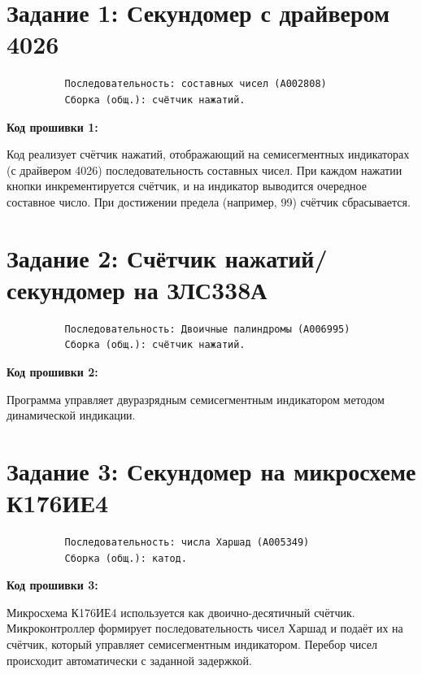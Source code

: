 \section*{Задание 1: Секундомер с драйвером 4026}
\begin{verbatim}
          Последовательность: составных чисел (A002808)
          Сборка (общ.): счётчик нажатий.
\end{verbatim}
\noindent
\textbf{Код прошивки 1:}

\noindent
\indent
Код реализует счётчик нажатий,
отображающий на семисегментных индикаторах (с драйвером 4026) последовательность составных чисел.
При каждом нажатии кнопки инкрементируется счётчик,
и на индикатор выводится очередное составное число.
При достижении предела (например, 99) счётчик сбрасывается.
\newpage
\section*{Задание 2: Счётчик нажатий/секундомер на ЗЛС338А}
\begin{verbatim}
          Последовательность: Двоичные палиндромы (A006995)
          Сборка (общ.): счётчик нажатий.
\end{verbatim}
\noindent
\textbf{Код прошивки 2:}

\noindent
\indent
Программа управляет двуразрядным семисегментным индикатором методом динамической индикации.
\newpage
\section*{Задание 3: Секундомер на микросхеме К176ИЕ4}
\begin{verbatim}
          Последовательность: числа Харшад (A005349)
          Сборка (общ.): катод.
\end{verbatim}
\noindent
\textbf{Код прошивки 3:}

\newpage
\noindent
\indent
Микросхема К176ИЕ4 используется как двоично-десятичный счётчик.
Микроконтроллер формирует последовательность чисел Харшад и подаёт их на счётчик,
который управляет семисегментным индикатором.
Перебор чисел происходит автоматически с заданной задержкой.
